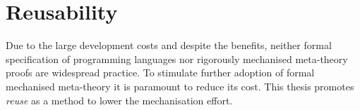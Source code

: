 {%


\section{Reusability}

Due to the large development costs and despite the benefits, neither formal
specification of programming languages nor rigorously mechanised meta-theory
proofs are widespread practice. To stimulate further adoption of formal
mechanised meta-theory it is paramount to reduce its cost. This thesis promotes
\emph{reuse} as a method to lower the mechanisation effort.

}
